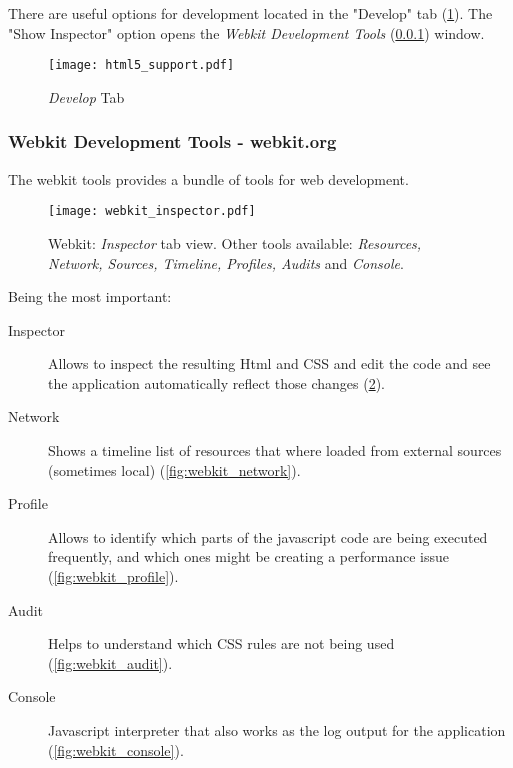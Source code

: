       

      There are useful options for development located in the "Develop" tab (\ref{fig:html5_support}).
      The "Show Inspector" option opens the \emph{Webkit Development Tools} (\ref{ssub:webkit_tools}) window.

      \begin{figure}
        \begin{center}
          \texttt{[image: html5\_support.pdf]}
        \end{center}
        \caption{\emph{Develop} Tab}
        \label{fig:html5_support}
      \end{figure}
    
    \subsubsection{Webkit Development Tools - webkit.org} %
    \label{ssub:webkit_tools}

      The webkit tools provides a bundle of tools for web development.

      \begin{figure}
        \begin{center}
          \texttt{[image: webkit\_inspector.pdf]}
        \end{center}
        \caption{Webkit: \emph{Inspector} tab view. Other tools available: \emph{Resources, Network, Sources, Timeline, Profiles, Audits} and \emph{Console}.}

        \label{fig:webkit_inspector}
      \end{figure}

      Being the most important:

      \begin{description}
        \item[Inspector] Allows to inspect the resulting Html and CSS and edit the code and see the application automatically reflect those changes (\ref{fig:webkit_inspector}).
        \item[Network] Shows a timeline list of resources that where loaded from external sources (sometimes local) (\ref{fig:webkit_network}).
        \item[Profile] Allows to identify which parts of the javascript code are being executed frequently, and which ones might be creating a performance issue (\ref{fig:webkit_profile}).
        \item[Audit] Helps to understand which CSS rules are not being used (\ref{fig:webkit_audit}).
        \item[Console] Javascript interpreter that also works as the log output for the application (\ref{fig:webkit_console}).

      \end{description}

